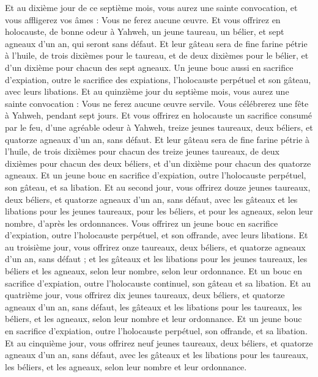 \begin{multicols}{2}
Et au dixième jour de ce septième mois, vous aurez une sainte convocation, et vous affligerez vos âmes : Vous ne ferez aucune œuvre.
Et vous offrirez en holocauste, de bonne odeur à Yahweh, un jeune taureau, un bélier, et sept agneaux d'un an, qui seront sans défaut.
Et leur gâteau sera de fine farine pétrie à l'huile, de trois dixièmes pour le taureau, et de deux dixièmes pour le bélier,
et d'un dixième pour chacun des sept agneaux.
Un jeune bouc aussi en sacrifice d'expiation, outre le sacrifice des expiations, l'holocauste perpétuel et son gâteau, avec leurs libations.
Et au quinzième jour du septième mois, vous aurez une sainte convocation : Vous ne ferez aucune œuvre servile. Vous célébrerez une fête à Yahweh, pendant sept jours.
Et vous offrirez en holocauste un sacrifice consumé par le feu, d'une agréable odeur à Yahweh, treize jeunes taureaux, deux béliers, et quatorze agneaux d'un an, sans défaut.
Et leur gâteau sera de fine farine pétrie à l’huile, de trois dixièmes pour chacun des treize jeunes taureaux, de deux dixièmes pour chacun des deux béliers,
et d'un dixième pour chacun des quatorze agneaux.
Et un jeune bouc en sacrifice d'expiation, outre l'holocauste perpétuel, son gâteau, et sa libation.
Et au second jour, vous offrirez douze jeunes taureaux, deux béliers, et quatorze agneaux d'un an, sans défaut,
avec les gâteaux et les libations pour les jeunes taureaux, pour les béliers, et pour les agneaux, selon leur nombre, d'après les ordonnances.
Vous offrirez un jeune bouc en sacrifice d'expiation, outre l'holocauste perpétuel, et son offrande, avec leurs libations.
Et au troisième jour, vous offrirez onze taureaux, deux béliers, et quatorze agneaux d'un an, sans défaut ;
et les gâteaux et les libations pour les jeunes taureaux, les béliers et les agneaux, selon leur nombre, selon leur ordonnance.
Et un bouc en sacrifice d'expiation, outre l'holocauste continuel, son gâteau et sa libation.
Et au quatrième jour, vous offrirez dix jeunes taureaux, deux béliers, et quatorze agneaux d'un an, sans défaut,
les gâteaux et les libations pour les taureaux, les béliers, et les agneaux, selon leur nombre et leur ordonnance.
Et un jeune bouc en sacrifice d'expiation, outre l'holocauste perpétuel, son offrande, et sa libation.
Et au cinquième jour, vous offrirez neuf jeunes taureaux, deux béliers, et quatorze agneaux d'un an, sans défaut,
avec les gâteaux et les libations pour les taureaux, les béliers, et les agneaux, selon leur nombre et leur ordonnance.

\end{multicols}
